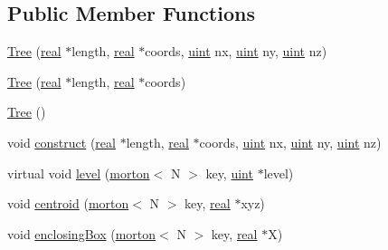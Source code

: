 \subsection*{Public Member Functions}
\begin{DoxyCompactItemize}
\item 
\mbox{\hyperlink{classTree_afd632b8d5a32c34865a305830558e256}{Tree}} (\mbox{\hyperlink{definitions_8h_aedc0ad84d1e764530814f57ad931d02a}{real}} $\ast$length, \mbox{\hyperlink{definitions_8h_aedc0ad84d1e764530814f57ad931d02a}{real}} $\ast$coords, \mbox{\hyperlink{definitions_8h_a69aa29b598b851b0640aa225a9e5d61d}{uint}} nx, \mbox{\hyperlink{definitions_8h_a69aa29b598b851b0640aa225a9e5d61d}{uint}} ny, \mbox{\hyperlink{definitions_8h_a69aa29b598b851b0640aa225a9e5d61d}{uint}} nz)
\item 
\mbox{\hyperlink{classTree_a6a43d80aaf3b7949cc412683161ef099}{Tree}} (\mbox{\hyperlink{definitions_8h_aedc0ad84d1e764530814f57ad931d02a}{real}} $\ast$length, \mbox{\hyperlink{definitions_8h_aedc0ad84d1e764530814f57ad931d02a}{real}} $\ast$coords)
\item 
\mbox{\hyperlink{classTree_a1435fce46bded38e5de4b1d5a1e1aca2}{Tree}} ()
\item 
void \mbox{\hyperlink{classTree_a56922413af6789f6ca5f64e110dc269b}{construct}} (\mbox{\hyperlink{definitions_8h_aedc0ad84d1e764530814f57ad931d02a}{real}} $\ast$length, \mbox{\hyperlink{definitions_8h_aedc0ad84d1e764530814f57ad931d02a}{real}} $\ast$coords, \mbox{\hyperlink{definitions_8h_a69aa29b598b851b0640aa225a9e5d61d}{uint}} nx, \mbox{\hyperlink{definitions_8h_a69aa29b598b851b0640aa225a9e5d61d}{uint}} ny, \mbox{\hyperlink{definitions_8h_a69aa29b598b851b0640aa225a9e5d61d}{uint}} nz)
\item 
virtual void \mbox{\hyperlink{classTree_a01f065cafedac5e2845e9d17bf87b783}{level}} (\mbox{\hyperlink{definitions_8h_af8682350bd8bb38ee9023f7a0a310add}{morton}}$<$ N $>$ key, \mbox{\hyperlink{definitions_8h_a69aa29b598b851b0640aa225a9e5d61d}{uint}} $\ast$level)
\item 
void \mbox{\hyperlink{classTree_aea583de3932917fd2cfbcd2d09318363}{centroid}} (\mbox{\hyperlink{definitions_8h_af8682350bd8bb38ee9023f7a0a310add}{morton}}$<$ N $>$ key, \mbox{\hyperlink{definitions_8h_aedc0ad84d1e764530814f57ad931d02a}{real}} $\ast$xyz)
\item 
void \mbox{\hyperlink{classTree_a9be1d9b3344d8c7300bc600e4d959ef1}{enclosing\+Box}} (\mbox{\hyperlink{definitions_8h_af8682350bd8bb38ee9023f7a0a310add}{morton}}$<$ N $>$ key, \mbox{\hyperlink{definitions_8h_aedc0ad84d1e764530814f57ad931d02a}{real}} $\ast$X)

\end{DoxyCompactItemize}
